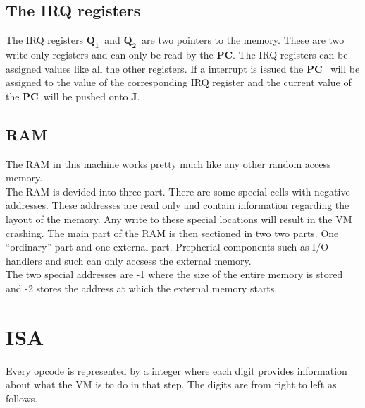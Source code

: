 \documentclass{article}
\newcommand{\q}{$\textbf{Q}_{\textbf{1}}$}
\newcommand{\qq}{$\textbf{Q}_{\textbf{2}}$}
\newcommand{\pc}{$\textbf{PC}$}
\newcommand{\J}{$\textbf{J}$}
\begin{document}
\subsection{The IRQ registers}
The IRQ registers \q \ and \qq \ are two pointers to the memory. These are two
write only registers and can only be read by the \pc. The IRQ registers can be
assigned values like all the other registers.  If a interrupt is issued the \pc
\ will be assigned to the value of the corresponding IRQ register and the current
value of the \pc \ will be pushed onto \J.

\subsection{RAM}
The RAM in this machine works pretty much like any other random access
memory.\\
The RAM is devided into three part. There are some special cells with negative
addresses. These addresses are read only and contain information regarding the
layout of the memory. Any write to these special locations will result in the
VM crashing. The main part of the RAM is then sectioned in two two parts. One
``ordinary'' part and one external part. Prepherial components such as I/O
handlers and such can only accsess the external memory.\\
The two special addresses are -1 where the size of the entire memory is stored
and -2 stores the address at which the external memory starts.

\section{ISA}
Every opcode is represented by a integer where each digit provides
information about what the VM is to do in that step. The digits are from right
to left as follows.
\end{document}
